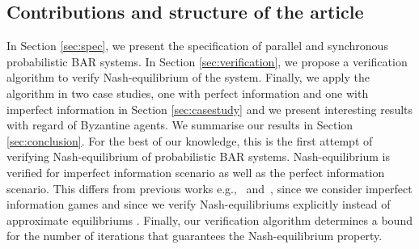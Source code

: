 \subsection{Contributions and structure of the article}
In Section \ref{sec:spec}, we present the specification of parallel and synchronous probabilistic BAR systems. In Section \ref{sec:verification}, we propose a verification algorithm to verify Nash-equilibrium of the system. Finally, we apply the algorithm in two case studies, one with perfect information and one with imperfect information in Section \ref{sec:casestudy} and we present interesting results with regard of Byzantine agents. We summarise our results in Section \ref{sec:conclusion}. For the best of our knowledge, this is the first attempt of verifying Nash-equilibrium of probabilistic BAR systems. Nash-equilibrium is verified for imperfect information scenario as well as the perfect information scenario. This differs from previous works e.g.,~\cite{CFKPS13} and~\cite{MMSTACL08}, since we consider imperfect information games and since we verify Nash-equilibriums explicitly instead of approximate equilibriums \cite{CFKPS13}. Finally, our verification algorithm determines a bound for the number of iterations that guarantees the Nash-equilibrium property.    
